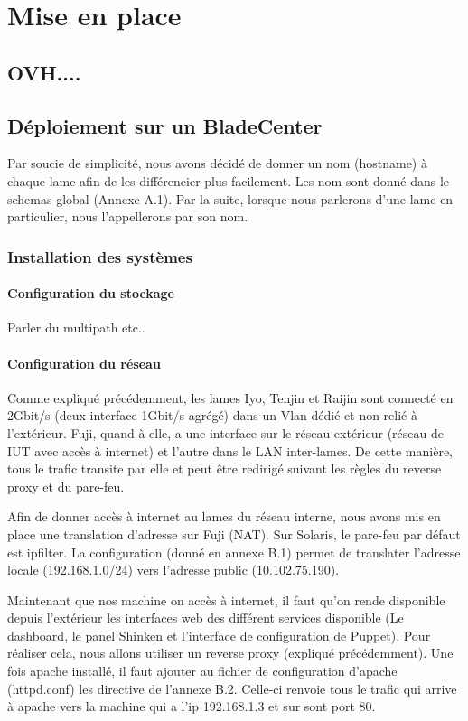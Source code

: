 \documentclass{report}
\begin{document}
\chapter{Mise en place}
\section{OVH....}

\section{Déploiement sur un BladeCenter}
Par soucie de simplicité, nous avons décidé de donner un nom (hostname) à chaque lame afin de les différencier plus facilement. Les nom sont donné dans le schemas global (Annexe A.1). Par la suite, lorsque nous parlerons d'une lame en particulier, nous l'appellerons par son nom.

\subsection{Installation des systèmes}

\subsubsection{Configuration du stockage}
Parler du multipath etc..

\subsubsection{Configuration du réseau}
Comme expliqué précédemment, les lames Iyo, Tenjin et Raijin sont connecté en 2Gbit/s (deux interface 1Gbit/s agrégé) dans un Vlan dédié et non-relié à l'extérieur. Fuji, quand à elle, a une interface sur le réseau extérieur (réseau de IUT avec accès à internet) et l'autre dans le LAN inter-lames. De cette manière, tous le trafic transite par elle et peut être redirigé suivant les règles du reverse proxy et du pare-feu. 

Afin de donner accès à internet au lames du réseau interne, nous avons mis en place une translation d'adresse sur Fuji (NAT). Sur Solaris, le pare-feu par défaut est ipfilter. La configuration (donné en annexe B.1) permet de translater l'adresse locale (192.168.1.0/24) vers l'adresse public (10.102.75.190).

Maintenant que nos machine on accès à internet, il faut qu'on rende disponible depuis l'extérieur les interfaces web des différent services disponible (Le dashboard, le panel Shinken et l'interface de configuration de Puppet). Pour réaliser cela, nous allons utiliser un reverse proxy (expliqué précédemment). Une fois apache installé, il faut ajouter au fichier de configuration d'apache (httpd.conf) les directive de l'annexe B.2. Celle-ci renvoie tous le trafic qui arrive à apache vers la machine qui a l'ip 192.168.1.3 et sur sont port 80.
\end{document}
